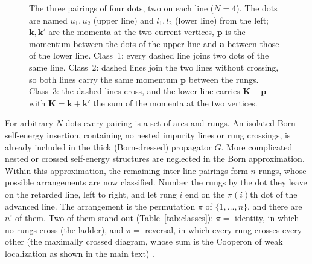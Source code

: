 \begin{figure}[ht]
\caption{The three pairings of four dots, two on each line ($N=4$).
The dots are named $u_1,u_2$ (upper line) and $l_1,l_2$ (lower
line) from the left; $\mathbf k,\mathbf k'$ are the momenta at
the two current vertices, $\mathbf p$ is the momentum between
the dots of the upper line and $\mathbf a$ between those of the
lower line. Class~1: every dashed line joins two dots of the
same line. Class~2: dashed lines join the two lines without
crossing, so both lines carry the same momentum $\mathbf p$
between the rungs. Class~3: the dashed lines cross, and the
lower line carries $\mathbf K-\mathbf p$ with
$\mathbf K=\mathbf k+\mathbf k'$ the sum of the momenta at the
two vertices.}
\label{fig:classes}
\end{figure}

For arbitrary $N$ dots every pairing is a set of arcs and rungs. An isolated Born self-energy insertion, containing no nested impurity lines
or rung crossings, is already included in the thick (Born-dressed)
propagator $\overline G$. More complicated nested or crossed
self-energy structures are neglected in the Born approximation.
Within this approximation, the remaining inter-line pairings
form $n$ rungs, whose possible arrangements are now classified.
Number the rungs by the dot they leave on the retarded line,
left to right, and let rung $i$ end on the $\pi(i)$th dot of the
advanced line. The arrangement is the permutation $\pi$ of
$\{1,\dots,n\}$, and there are $n!$ of them. Two of them stand
out (Table~\ref{tab:classes}): $\pi=$ identity, in which no rungs
cross (the ladder), and $\pi=$ reversal, in which every rung
crosses every other (the maximally crossed diagram, whose sum
is the Cooperon of weak localization as shown in the main text)
\cite{BruusFlensberg}.

